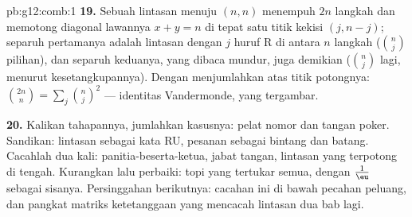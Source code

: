 \begin{solution}{pb:g12:comb:1}
\textbf{19.} Sebuah lintasan menuju $(n, n)$ menempuh $2n$ langkah dan memotong
diagonal lawannya $x + y = n$ di tepat satu titik kekisi
$(j, n - j)$; separuh pertamanya adalah lintasan dengan $j$ huruf R di antara $n$
langkah ($\binom nj$ pilihan), dan separuh keduanya, yang dibaca mundur,
juga demikian ($\binom nj$ lagi, menurut kesetangkupannya). Dengan menjumlahkan
atas titik potongnya: $\binom{2n}{n} = \sum_j \binom nj^2$ ---
identitas Vandermonde, yang tergambar.

\textbf{20.} Kalikan tahapannya, jumlahkan kasusnya: pelat nomor dan tangan
poker. Sandikan: lintasan sebagai kata RU, pesanan sebagai bintang dan batang.
Cacahlah dua kali: panitia-beserta-ketua, jabat tangan, lintasan yang terpotong
di tengah. Kurangkan lalu perbaiki: topi yang tertukar semua, dengan $\frac1\eu$
sebagai sisanya. Persinggahan berikutnya: cacahan ini di bawah pecahan
peluang, dan pangkat matriks ketetanggaan yang mencacah lintasan
dua bab lagi.

\end{solution}
